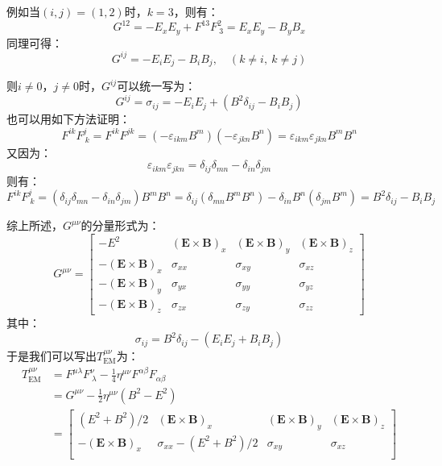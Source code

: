 \documentclass[a4paper]{article}
\renewcommand\epsilon\varepsilon
\begin{document}
\begin{enumerate}
\begin{enumerate}
\begin{enumerate}
            例如当$(i,j) = (1,2)$时，$k = 3$，则有：
            \[
                G^{12} = -E_x E_y + F^{13} F^2_{\ 3} = E_x E_y - B_y B_x
            \]
            同理可得：
            \[
                G^{ij} = -E_i E_j - B_i B_j,\quad (k \neq i,\ k \neq j)
            \]
        \end{enumerate}
        则$i \neq 0$，$j \neq 0$时，$G^{ij}$可以统一写为：
        \[
            G^{ij} = \sigma_{ij} = -E_i E_j + (B^2 \delta_{ij} - B_i B_j)
        \]
        也可以用如下方法证明：
        \[
            F^{ik}F^j_{\ k} = F^{ik}F^{jk} = (-\epsilon_{ikm} B^m)(-\epsilon_{jkn} B^n) = \epsilon_{ikm} \epsilon_{jkn} B^m B^n
        \]
        又因为：
        \[
            \epsilon_{ikm} \epsilon_{jkn} = \delta_{ij} \delta_{mn} - \delta_{in} \delta_{jm}
        \]
        则有：
        \[
            F^{ik}F^j_{\ k} = (\delta_{ij} \delta_{mn} - \delta_{in} \delta_{jm}) B^m B^n = \delta_{ij}(\delta_{mn} B^m B^n) - \delta_{in}B^n (\delta_{jm} B^m) = B^2 \delta_{ij} - B_i B_j
        \]
    \end{enumerate}
    综上所述，$G^{\mu\nu}$的分量形式为：
    \[
        G^{\mu\nu} =
        \begin{bmatrix}
        -E^2 & (\mathbf{E} \times \mathbf{B})_x & (\mathbf{E} \times \mathbf{B})_y & (\mathbf{E} \times \mathbf{B})_z \\
        -(\mathbf{E} \times \mathbf{B})_x & \sigma_{xx} & \sigma_{xy} & \sigma_{xz} \\
        -(\mathbf{E} \times \mathbf{B})_y & \sigma_{yx} & \sigma_{yy} & \sigma_{yz} \\
        -(\mathbf{E} \times \mathbf{B})_z & \sigma_{zx} & \sigma_{zy} & \sigma_{zz}
        \end{bmatrix}
    \]
    其中：
    \[
        \sigma_{ij} = B^2 \delta_{ij} - (E_i E_j + B_i B_j)
    \]
    于是我们可以写出$T_{\mathrm{EM}}^{\mu\nu}$为：
    \begin{align*}
        T_{\mathrm{EM}}^{\mu\nu}
        &= F^{\mu\lambda} F^\nu_{\ \lambda} - \frac{1}{4} \eta^{\mu\nu} F^{\alpha\beta} F_{\alpha\beta} \\
        &= G^{\mu\nu} - \frac{1}{2} \eta^{\mu\nu} (B^2 - E^2) \\
        &= \begin{bmatrix}
        (E^2 + B^2)/2 & (\mathbf{E} \times \mathbf{B})_x & (\mathbf{E} \times \mathbf{B})_y & (\mathbf{E} \times \mathbf{B})_z \\
        -(\mathbf{E} \times \mathbf{B})_x & \sigma_{xx} - (E^2 + B^2)/2 & \sigma_{xy} & \sigma_{xz} \\

\end{bmatrix}
\end{align*}
\end{enumerate}
\end{document}

